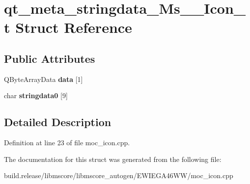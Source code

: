 \hypertarget{structqt__meta__stringdata___ms_____icon__t}{}\section{qt\+\_\+meta\+\_\+stringdata\+\_\+\+Ms\+\_\+\+\_\+\+Icon\+\_\+t Struct Reference}
\label{structqt__meta__stringdata___ms_____icon__t}
\subsection*{Public Attributes}
\begin{DoxyCompactItemize}
\item 
\mbox{\label{structqt__meta__stringdata___ms_____icon__t_ad2a3c8cca0be8414309b3191583f6d0e}} 
Q\+Byte\+Array\+Data {\bfseries data} \mbox{[}1\mbox{]}
\item 
\mbox{\label{structqt__meta__stringdata___ms_____icon__t_a875ec04026465db6575720d97a6957a1}} 
char {\bfseries stringdata0} \mbox{[}9\mbox{]}
\end{DoxyCompactItemize}


\subsection{Detailed Description}


Definition at line 23 of file moc\+\_\+icon.\+cpp.



The documentation for this struct was generated from the following file\+:\begin{DoxyCompactItemize}
\item 
build.\+release/libmscore/libmscore\+\_\+autogen/\+E\+W\+I\+E\+G\+A46\+W\+W/moc\+\_\+icon.\+cpp\end{DoxyCompactItemize}
